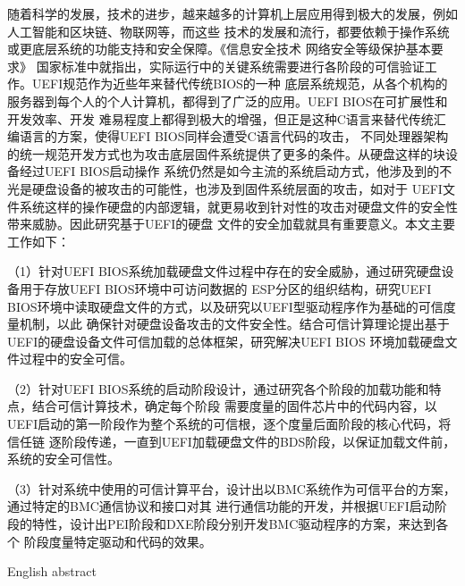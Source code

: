 \begin{cabstract}

随着科学的发展，技术的进步，越来越多的计算机上层应用得到极大的发展，例如人工智能和区块链、物联网等，而这些
技术的发展和流行，都要依赖于操作系统或更底层系统的功能支持和安全保障。《信息安全技术 网络安全等级保护基本要求》
国家标准中就指出，实际运行中的关键系统需要进行各阶段的可信验证工作。UEFI规范作为近些年来替代传统BIOS的一种
底层系统规范，从各个机构的服务器到每个人的个人计算机，都得到了广泛的应用。UEFI BIOS在可扩展性和开发效率、开发
难易程度上都得到极大的增强，但正是这种C语言来替代传统汇编语言的方案，使得UEFI BIOS同样会遭受C语言代码的攻击，
不同处理器架构的统一规范开发方式也为攻击底层固件系统提供了更多的条件。从硬盘这样的块设备经过UEFI BIOS启动操作
系统仍然是如今主流的系统启动方式，他涉及到的不光是硬盘设备的被攻击的可能性，也涉及到固件系统层面的攻击，如对于
UEFI文件系统这样的操作硬盘的内部逻辑，就更易收到针对性的攻击对硬盘文件的安全性带来威胁。因此研究基于UEFI的硬盘
文件的安全加载就具有重要意义。本文主要工作如下：
\par （1）针对UEFI BIOS系统加载硬盘文件过程中存在的安全威胁，通过研究硬盘设备用于存放UEFI BIOS环境中可访问数据的
ESP分区的组织结构，研究UEFI BIOS环境中读取硬盘文件的方式，以及研究以UEFI型驱动程序作为基础的可信度量机制，以此
确保针对硬盘设备攻击的文件安全性。结合可信计算理论提出基于UEFI的硬盘设备文件可信加载的总体框架，研究解决UEFI BIOS
环境加载硬盘文件过程中的安全可信。
\par （2）针对UEFI BIOS系统的启动阶段设计，通过研究各个阶段的加载功能和特点，结合可信计算技术，确定每个阶段
需要度量的固件芯片中的代码内容，以UEFI启动的第一阶段作为整个系统的可信根，逐个度量后面阶段的核心代码，将信任链
逐阶段传递，一直到UEFI加载硬盘文件的BDS阶段，以保证加载文件前，系统的安全可信性。
\par （3）针对系统中使用的可信计算平台，设计出以BMC系统作为可信平台的方案，通过特定的BMC通信协议和接口对其
进行通信功能的开发，并根据UEFI启动阶段的特性，设计出PEI阶段和DXE阶段分别开发BMC驱动程序的方案，来达到各个
阶段度量特定驱动和代码的效果。
\par 

\end{cabstract}


\begin{eabstract}

English abstract

\end{eabstract}

